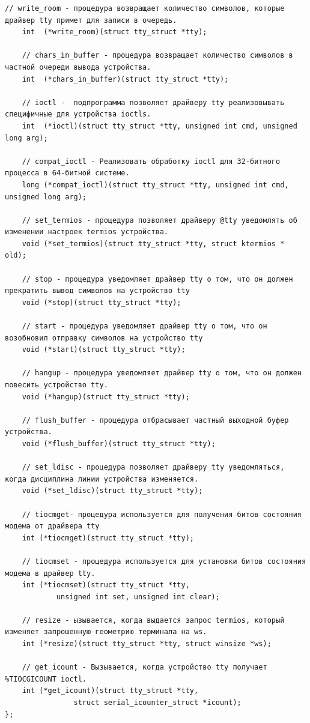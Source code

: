 \begin{lstlisting}[caption = Описание struct tty\_operations, label = {lst:21}]
    // write_room - процедура возвращает количество символов, которые драйвер tty примет для записи в очередь.
    int  (*write_room)(struct tty_struct *tty);
    
    // chars_in_buffer - процедура возвращает количество символов в частной очереди вывода устройства.
    int  (*chars_in_buffer)(struct tty_struct *tty);
    
    // ioctl -  подпрограмма позволяет драйверу tty реализовывать специфичные для устройства ioctls.
    int  (*ioctl)(struct tty_struct *tty, unsigned int cmd, unsigned long arg);
    
    // compat_ioctl - Реализовать обработку ioctl для 32-битного процесса в 64-битной системе. 
    long (*compat_ioctl)(struct tty_struct *tty, unsigned int cmd, unsigned long arg);
    
    // set_termios - процедура позволяет драйверу @tty уведомлять об изменении настроек termios устройства.
    void (*set_termios)(struct tty_struct *tty, struct ktermios * old);
    
    // stop - процедура уведомляет драйвер tty о том, что он должен прекратить вывод символов на устройство tty
    void (*stop)(struct tty_struct *tty);
    
    // start - процедура уведомляет драйвер tty о том, что он возобновил отправку символов на устройство tty
    void (*start)(struct tty_struct *tty);
    
    // hangup - процедура уведомляет драйвер tty о том, что он должен повесить устройство tty.
    void (*hangup)(struct tty_struct *tty);
    
    // flush_buffer - процедура отбрасывает частный выходной буфер устройства.
    void (*flush_buffer)(struct tty_struct *tty);
    
    // set_ldisc - процедура позволяет драйверу tty уведомляться, когда дисциплина линии устройства изменяется.
    void (*set_ldisc)(struct tty_struct *tty);
    
    // tiocmget- процедура используется для получения битов состояния модема от драйвера tty
    int (*tiocmget)(struct tty_struct *tty);
    
    // tiocmset - процедура используется для установки битов состояния модема в драйвер tty.
    int (*tiocmset)(struct tty_struct *tty,
            unsigned int set, unsigned int clear);
            
    // resize - ызывается, когда выдается запрос termios, который изменяет запрошенную геометрию терминала на ws.
    int (*resize)(struct tty_struct *tty, struct winsize *ws);
    
    // get_icount - Вызывается, когда устройство tty получает %TIOCGICOUNT ioctl.
    int (*get_icount)(struct tty_struct *tty,
                struct serial_icounter_struct *icount);
};
\end{lstlisting}
